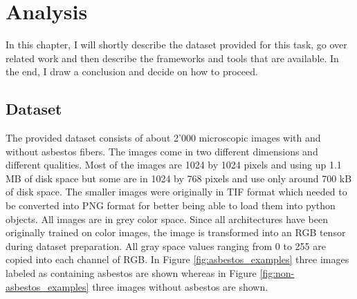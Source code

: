 \chapter{Analysis}

In this chapter, I will shortly describe the dataset provided for this task, go over related work and then describe the frameworks and tools that are available. In the end, I draw a conclusion and decide on how to proceed.

\section{Dataset}

The provided dataset consists of about 2'000 microscopic images with and without asbestos fibers. The images come in two different dimensions and different qualities. Most of the images are 1024 by 1024 pixels and using up 1.1 MB of disk space but some are in 1024 by 768 pixels and use only around 700 kB of disk space. The smaller images were originally in TIF format which needed to be converted into PNG format for better being able to load them into python objects. All images are in grey color space. Since all architectures have been originally trained on color images, the image is transformed into an RGB tensor during dataset preparation. All gray space values ranging from 0 to 255 are copied into each channel of RGB. In Figure \ref{fig:asbestos_examples} three images labeled as containing asbestos are shown whereas in Figure \ref{fig:non-asbestos_examples} three images without asbestos are shown.\\


